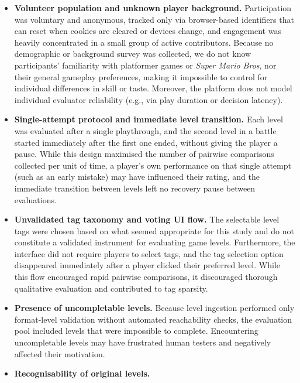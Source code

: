 \documentclass[shortabstract, mgr, english]{iithesis}
\begin{document}
\begin{itemize}
    \item \textbf{Volunteer population and unknown player background.}
          Participation was voluntary and anonymous, tracked only via
          browser-based identifiers that can reset when cookies are cleared or
          devices change, and engagement was heavily concentrated in a small
          group of active contributors. Because no demographic or background
          survey was collected, we do not know participants' familiarity with
          platformer games or \emph{Super Mario Bros}, nor their general
          gameplay preferences, making it impossible to control for individual
          differences in skill or taste. Moreover, the platform does not model
          individual evaluator reliability (e.g., via play duration or decision
          latency).
    \item \textbf{Single-attempt protocol and immediate level transition.}
          Each level was evaluated after a single playthrough, and the second
          level in a battle started immediately after the first one ended,
          without giving the player a pause. While this design maximised the
          number of pairwise comparisons collected per unit of time, a player's
          own performance on that single attempt (such as an early mistake) may
          have influenced their rating, and the immediate transition between
          levels left no recovery pause between evaluations.
    \item \textbf{Unvalidated tag taxonomy and voting UI flow.}
          The selectable level tags were chosen based on what seemed
          appropriate for this study and do not constitute a validated
          instrument for evaluating game levels. Furthermore, the interface did
          not require players to select tags, and the tag selection option
          disappeared immediately after a player clicked their preferred level.
          While this flow encouraged rapid pairwise comparisons, it discouraged
          thorough qualitative evaluation and contributed to tag sparsity.
    \item \textbf{Presence of uncompletable levels.}
          Because level ingestion performed only format-level validation without
          automated reachability checks, the evaluation pool included levels
          that were impossible to complete. Encountering uncompletable levels
          may have frustrated human testers and negatively affected their
          motivation.
    \item \textbf{Recognisability of original levels.}

\end{itemize}
\end{document}
